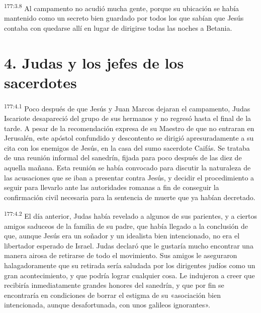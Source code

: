 \par 
\textsuperscript{177:3.8} Al campamento no acudió mucha gente, porque su ubicación se había mantenido como un secreto bien guardado por todos los que sabían que Jesús contaba con quedarse allí en lugar de dirigirse todas las noches a Betania.

\section*{4. Judas y los jefes de los sacerdotes}
\par 
\textsuperscript{177:4.1} Poco después de que Jesús y Juan Marcos dejaran el campamento, Judas Iscariote desapareció del grupo de sus hermanos y no regresó hasta el final de la tarde. A pesar de la recomendación expresa de su Maestro de que no entraran en Jerusalén, este apóstol confundido y descontento se dirigió apresuradamente a su cita con los enemigos de Jesús, en la casa del sumo sacerdote Caifás. Se trataba de una reunión informal del sanedrín, fijada para poco después de las diez de aquella mañana. Esta reunión se había convocado para discutir la naturaleza de las acusaciones que se iban a presentar contra Jesús, y decidir el procedimiento a seguir para llevarlo ante las autoridades romanas a fin de conseguir la confirmación civil necesaria para la sentencia de muerte que ya habían decretado.

\par 
\textsuperscript{177:4.2} El día anterior, Judas había revelado a algunos de sus parientes, y a ciertos amigos saduceos de la familia de su padre, que había llegado a la conclusión de que, aunque Jesús era un soñador y un idealista bien intencionado, no era el libertador esperado de Israel. Judas declaró que le gustaría mucho encontrar una manera airosa de retirarse de todo el movimiento. Sus amigos le aseguraron halagadoramente que su retirada sería saludada por los dirigentes judíos como un gran acontecimiento, y que podría lograr cualquier cosa. Le indujeron a creer que recibiría inmediatamente grandes honores del sanedrín, y que por fin se encontraría en condiciones de borrar el estigma de su «asociación bien intencionada, aunque desafortunada, con unos galileos ignorantes».

